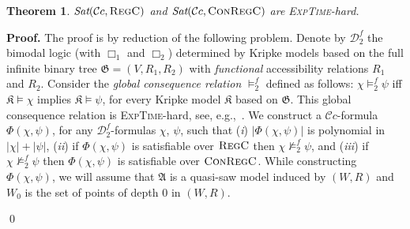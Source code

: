 \documentclass{LMCS}
\renewenvironment{proof}{\par\noindent\textbf{Proof.}}{\mbox{}\qed\par\medskip}
\theoremstyle{plain}
\newtheorem{theorem}[thm]{Theorem}
\newcommand{\cBC}{\ensuremath{\mathcal{C}}}
\newcommand{\cBCc}{\ensuremath{\cBC{}c}} \newcommand{\cBCcc}{\ensuremath{\cBC{}cc}}
\newcommand{\Sat}{\textit{Sat}}
\newcommand{\Regc}{\textsc{RegC}}
\newcommand{\ConR}{\textsc{ConRegC}}
\newcommand{\ExpTime}{\textsc{ExpTime}}
\begin{document}
\begin{theorem}\label{thm:BRCC-8:ExpTime}
$\Sat( \cBCc , \Regc)$ and $\Sat(
\cBCc , \ConR)$ are \ExpTime{}-hard.
\end{theorem}
\begin{proof}
The proof is by reduction of the following problem. Denote by
$\mathcal{D}_2^f$ the bimodal logic (with $\Box_1$ and $\Box_2$)
determined by  Kripke models based on the full infinite
binary tree $\mathfrak G= (V,R_1,R_2)$ with \emph{functional}
accessibility relations $R_1$ and $R_2$. Consider the \emph{global
consequence relation} $\models^f_2$ defined as follows: $\chi
\models^f_2 \psi$ iff $\mathfrak{K} \models \chi$ implies
$\mathfrak{K} \models \psi$, for every Kripke model $\mathfrak K$
based on $\mathfrak G$. This global consequence relation is \ExpTime-hard, see, e.g.,~\cite{Spaan}.
We construct a $\cBCc$-formula $\Phi(\chi,\psi)$, for any
$\mathcal{D}_2^f$-formulas $\chi$, $\psi$, such that (\textit{i})
$|\Phi(\chi,\psi)|$ is polynomial in $|\chi| + |\psi|$,
(\textit{ii}) if $\Phi(\chi,\psi)$ is satisfiable over $\Regc$ then $\chi \not\models^f_2 \psi$, and (\textit{iii}) if $\chi \not\models^f_2 \psi$ then $\Phi(\chi,\psi)$ is satisfiable over $\ConR$.
While constructing
$\Phi(\chi,\psi)$, we will assume that $\mathfrak A$ is a quasi-saw
model induced by $(W,R)$ and $W_0$ is the set of points of depth $0$
in $(W,R)$.


\end{proof}
\end{document}
